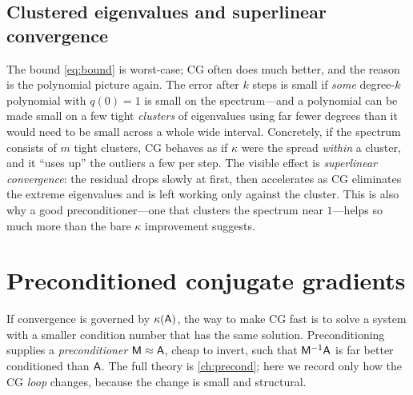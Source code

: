 \subsection{Clustered eigenvalues and superlinear convergence}
\label{sec:cluster}

The bound \eqref{eq:bound} is worst-case; CG often does much better, and the
reason is the polynomial picture again. The error after $k$ steps is small if
\emph{some} degree-$k$ polynomial with $q(0)=1$ is small on the spectrum---and a
polynomial can be made small on a few tight \emph{clusters} of eigenvalues using
far fewer degrees than it would need to be small across a whole wide interval.
Concretely, if the spectrum consists of $m$ tight clusters, CG behaves as if
$\kappa$ were the spread \emph{within} a cluster, and it ``uses up'' the
outliers a few per step. The visible effect is \emph{superlinear convergence}: the
residual drops slowly at first, then accelerates as CG eliminates the extreme
eigenvalues and is left working only against the cluster. This is also why a good
preconditioner---one that clusters the spectrum near $1$---helps so much more than
the bare $\kappa$ improvement suggests.

\section{Preconditioned conjugate gradients}
\label{sec:pcg}

If convergence is governed by $\kappa(\mathsf{A})$, the way to make CG fast is to
solve a system with a smaller condition number that has the same solution.
Preconditioning supplies a \emph{preconditioner} $\mathsf{M}\approx\mathsf{A}$, cheap to
invert, such that $\mathsf{M}^{-1}\mathsf{A}$ is far better conditioned than $\mathsf{A}$.
The full theory is \cref{ch:precond}; here we record only how the CG \emph{loop}
changes, because the change is small and structural.

